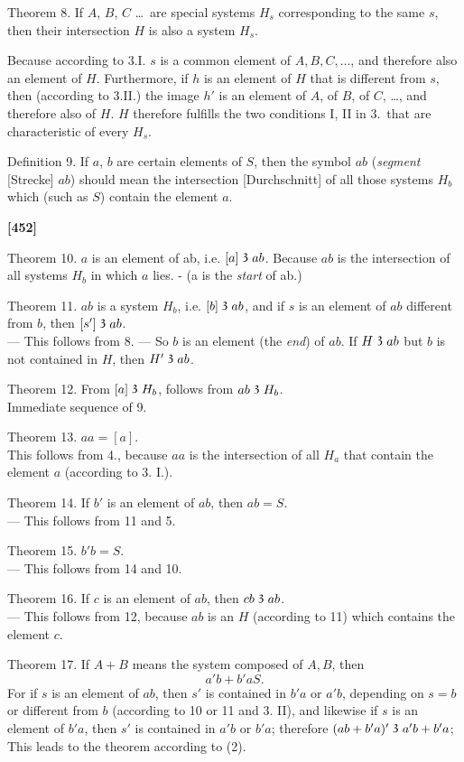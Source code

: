 \documentclass[leqno]{article}
\newcommand\partof{\mathrel{\raisebox{0.45ex}{$\mathfrak{3}$}}}
\begin{document}
Theorem 8. If $A$, $B$, $C$ \ldots\ are special systems $H_s$ corresponding to the same $s$, then their intersection $H$ is also a system $H_s$.

Because according to 3.I. $s$ is a common element of $A, B, C, \ldots$, and therefore also an element of $H$. 
Furthermore, if $h$ is an element of $H$ that is different from $s$, then (according to 3.II.) the image $h'$ is an element of $A$, of $B$, of $C$, \ldots, and therefore also of $H$. 
$H$ therefore fulfills the two conditions I, II in 3.\ that are characteristic of every $H_s$.

Definition 9. If $a$, $b$ are certain elements of $S$, then the symbol $ab$ (\emph{segment} [Strecke] $ab$) should mean the intersection [Durchschnitt] of all those systems $H_b$  which (such as $S$) contain the element $a$.

\textbf{[452]}

Theorem 10. $a$ is an element of ab, i.e. $[a] \partof ab$. Because $ab$ is the intersection of all systems $H_b$ in which $a$ lies. - (a is the \emph{start} of ab.)

Theorem 11. $ab$ is a system $H_b$, i.e. $[b] \partof ab$, and if $s$ is an element of $ab$ different from $b$, then $[s'] \partof ab$.\\ 
--- This follows from 8. --- So $b$ is an element (the \emph{end}) of $ab$. If $H \partof ab$ but $b$ is not contained in $H$, then $H' \partof ab$. 

Theorem 12. From $[a] \partof H_b$, follows from $ab \partof H_b$. \\
Immediate sequence of 9. 

Theorem 13. $aa = [a]$. \\
This follows from 4., because $aa$ is the intersection of all $H_a$ that contain the element $a$ (according to 3. I.).

Theorem 14. If $b'$ is an element of $ab$, then $ab = S$. \\
--- This follows from 11 and 5. 

Theorem 15. $b' b = S$. \\
--- This follows from 14 and 10.

Theorem 16. If $c$ is an element of $ab$, then $cb \partof ab$.\\ 
--- This follows from 12, because $ab$ is an $H$ (according to 11) which contains the element $c$.

Theorem 17. If $A + B$ means the system composed of $A, B$, then 
\[
	a'b + b'a S.
\]
For if $s$ is an element of $ab$, then $s'$ is contained in $b'a$ or $a'b$, depending on $s = b$ or different from $b$ (according to 10 or 11 and 3. II), and likewise if $s$ is an element of $b'a$, then $s'$ is contained in $a'b$ or $b'a$; therefore $(ab + b'a)' \partof a'b + b'a$; This leads to the theorem according to (2).
\end{document}
